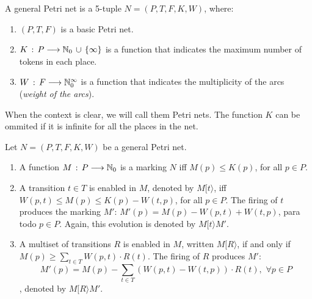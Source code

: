 \begin{definition} 
A general Petri net is a 5-tuple $N=(P,T,F,K,W)$, where:
\begin{enumerate}
\item $(P,T,F)$ is a basic Petri net.
\item $K\,:\,P \longrightarrow \mathbb{N}_{0} \,\cup\, \{\infty\}$ is a function that
indicates the maximum number of tokens in each place.
\item $W\,:\,F \longrightarrow \mathbb{N}_{0}^{\infty}$ is a function that indicates
the multiplicity of the arcs ({\it weight of the arcs}).
\end{enumerate}
When the context is clear, we will call them Petri nets. The function $K$
can be ommited if it is infinite for all the places in the net.
\end{definition}

\begin{definition} 
Let $N=(P,T,F,K,W)$ be a general Petri net.
\begin{enumerate}
\item A function $M\,:\, P \longrightarrow \mathbb{N}_{0}$ is a marking
$N$ iff $M(p) \leq K(p)$, for all
$p \in P$.
\item A transition $t \in T$ is enabled in $M$, denoted by $M[ t \rangle$,
iff $W(p,t) \leq M(p) \leq K(p) - W(t,p)$, for all $p \in P$.
The firing of $t$ produces the marking $M'$:
$M'(p) = M(p) - W(p,t) + W(t,p)$, para todo $p \in P$.
Again, this evolution is denoted by $M[ t \rangle M'$.
\item A multiset of transitions $R$ is enabled in $M$, written $M [ R \rangle$, if and only if
$M(p) \geq \sum_{t \in T} W(p,t) \cdot R(t)$. The firing of $R$
produces $M'$:
\[ M'(p) = M(p) - \sum_{t \in T} (W(p,t) - W(t,p)) \cdot R(t), \,\,
\forall p \in P\], denoted by $M [ R \rangle M'$.
\end{enumerate}
\end{definition}

